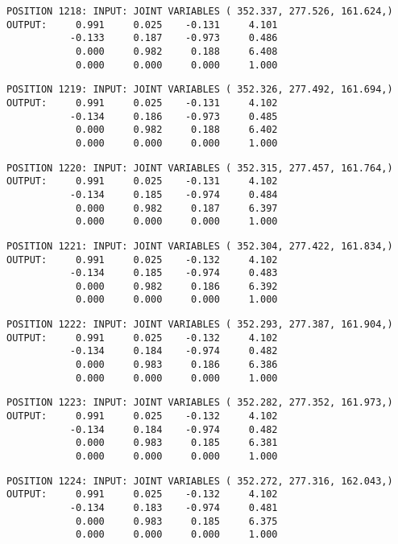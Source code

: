 \begin{verbatim}
POSITION 1218: INPUT: JOINT VARIABLES ( 352.337, 277.526, 161.624,)
OUTPUT:     0.991     0.025    -0.131     4.101
           -0.133     0.187    -0.973     0.486
            0.000     0.982     0.188     6.408
            0.000     0.000     0.000     1.000
\end{verbatim} \pagebreak[1]\begin{verbatim}
POSITION 1219: INPUT: JOINT VARIABLES ( 352.326, 277.492, 161.694,)
OUTPUT:     0.991     0.025    -0.131     4.102
           -0.134     0.186    -0.973     0.485
            0.000     0.982     0.188     6.402
            0.000     0.000     0.000     1.000
\end{verbatim} \pagebreak[1]\begin{verbatim}
POSITION 1220: INPUT: JOINT VARIABLES ( 352.315, 277.457, 161.764,)
OUTPUT:     0.991     0.025    -0.131     4.102
           -0.134     0.185    -0.974     0.484
            0.000     0.982     0.187     6.397
            0.000     0.000     0.000     1.000
\end{verbatim} \pagebreak[1]\begin{verbatim}
POSITION 1221: INPUT: JOINT VARIABLES ( 352.304, 277.422, 161.834,)
OUTPUT:     0.991     0.025    -0.132     4.102
           -0.134     0.185    -0.974     0.483
            0.000     0.982     0.186     6.392
            0.000     0.000     0.000     1.000
\end{verbatim} \pagebreak[1]\begin{verbatim}
POSITION 1222: INPUT: JOINT VARIABLES ( 352.293, 277.387, 161.904,)
OUTPUT:     0.991     0.025    -0.132     4.102
           -0.134     0.184    -0.974     0.482
            0.000     0.983     0.186     6.386
            0.000     0.000     0.000     1.000
\end{verbatim} \pagebreak[1]\begin{verbatim}
POSITION 1223: INPUT: JOINT VARIABLES ( 352.282, 277.352, 161.973,)
OUTPUT:     0.991     0.025    -0.132     4.102
           -0.134     0.184    -0.974     0.482
            0.000     0.983     0.185     6.381
            0.000     0.000     0.000     1.000
\end{verbatim} \pagebreak[1]\begin{verbatim}
POSITION 1224: INPUT: JOINT VARIABLES ( 352.272, 277.316, 162.043,)
OUTPUT:     0.991     0.025    -0.132     4.102
           -0.134     0.183    -0.974     0.481
            0.000     0.983     0.185     6.375
            0.000     0.000     0.000     1.000
\end{verbatim} \pagebreak[1]\begin{verbatim}

\end{verbatim}
